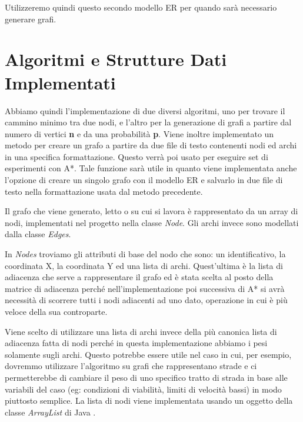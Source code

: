 \documentclass[12pt,a4paper]{report}
\begin{document}
Utilizzeremo quindi questo secondo modello ER per quando sarà necessario generare grafi.


\chapter{Algoritmi e Strutture Dati Implementati}\label{ch:algo-struc-impl}

Abbiamo quindi l'implementazione di due diversi algoritmi, uno per trovare il cammino minimo tra due nodi, e l'altro per la generazione di grafi a partire dal numero di vertici \textbf{n} e da una probabilità \textbf{p}. 
Viene inoltre implementato un metodo per creare un grafo a partire da due file di testo contenenti nodi ed archi in una specifica formattazione. Questo verrà poi usato per eseguire set di esperimenti con A*. Tale funzione sarà utile in quanto viene implementata anche l'opzione di creare un singolo grafo con il modello ER e salvarlo in due file di testo nella formattazione usata dal metodo precedente.

Il grafo che viene generato, letto o su cui si lavora è rappresentato da un array di nodi, implementati nel progetto nella classe \textit{Node}. Gli archi invece sono modellati dalla classe \textit{Edges}. 

In \textit{Nodes} troviamo gli attributi di base del nodo che sono: un identificativo, la coordinata X, la coordinata Y ed una lista di archi. Quest'ultima è la lista di adiacenza che serve a rappresentare il grafo ed è stata scelta al posto della matrice di adiacenza perché nell'implementazione poi successiva di A* si avrà necessità di scorrere tutti i nodi adiacenti ad uno dato, operazione in cui è più veloce della sua controparte.

Viene scelto di utilizzare una lista di archi invece della più canonica lista di adiacenza fatta di nodi perché in questa implementazione abbiamo i pesi solamente sugli archi. Questo potrebbe essere utile nel caso in cui, per esempio, dovremmo utilizzare l'algoritmo su grafi che rappresentano strade e ci permetterebbe di cambiare il peso di uno specifico tratto di strada in base alle variabili del caso (eg: condizioni di viabilità, limiti di velocità bassi) in modo piuttosto semplice.
La lista di nodi viene implementata usando un oggetto della classe \textit{ArrayList} di Java \cite{oracleArrayListJava}.
\end{document}

